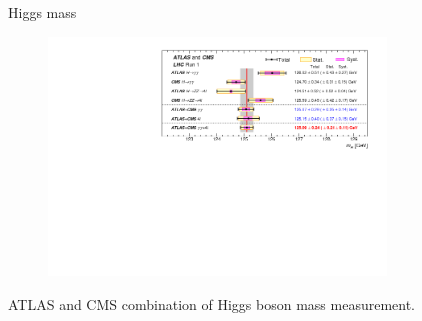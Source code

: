 \begin{frame}{Higgs mass}
\vspace{-.2cm}
\begin{figure}[!Hhtbp]
  \begin{center}
    \includegraphics[trim=10cm 7cm 1cm 1cm, clip=true, width=0.8\textwidth]{../figs/LHC_combined_obs_unblind_summary_a1_final.png}
  \end{center}
\end{figure}

\vspace{-.2cm}
    \begin{block}{}
      \tiny \centering ATLAS and CMS combination of Higgs boson mass measurement.
    \end{block}

\end{frame}

